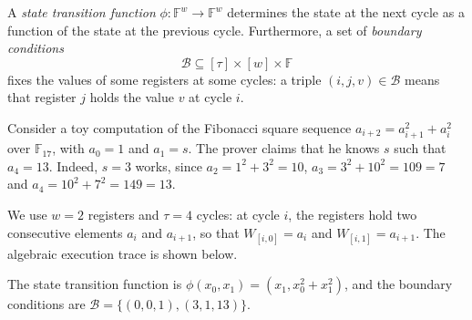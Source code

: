 \documentclass[../../book]{subfiles}
\begin{document}
\begin{definition}\label{def:st-function}
  A \emph{state transition function} $\phi: \mathbb{F}^{w} \to \mathbb{F}^{w}$ determines the state at the next cycle as a function of the state at the previous cycle.
  Furthermore, a set of \emph{boundary conditions}
  \begin{equation*}
    \mathcal{B} \subseteq [\tau] \times [w] \times \mathbb{F}
  \end{equation*}
  fixes the values of some registers at some cycles: a triple $(i, j, v) \in \mathcal{B}$ means that register $j$ holds the value $v$ at cycle $i$.
\end{definition}

\begin{example}\label{ex:stark-fibsq-1}
  Consider a toy computation of the Fibonacci square sequence $a_{i+2} = a_{i+1}^2 + a_i^2$ over $\mathbb{F}_{17}$, with $a_0 = 1$ and $a_1 = s$.
  The prover claims that he knows $s$ such that $a_4 = 13$.
  Indeed, $s = 3$ works, since $a_2 = 1^2 + 3^2 = 10$, $a_3 = 3^2 + 10^2 = 109 = 7$ and $a_4 = 10^2 + 7^2 = 149 = 13$.

  We use $w = 2$ registers and $\tau = 4$ cycles: at cycle $i$, the registers hold two consecutive elements $a_i$ and $a_{i+1}$, so that $W_{[i,0]} = a_i$ and $W_{[i,1]} = a_{i+1}$.
  The algebraic execution trace is shown below.
  \begin{center}
  \end{center}
  The state transition function is $\phi(x_0, x_1) = (x_1, x_0^2 + x_1^2)$, and the boundary conditions are $\mathcal{B} = \{(0, 0, 1), (3, 1, 13)\}$.
\end{example}
\end{document}
